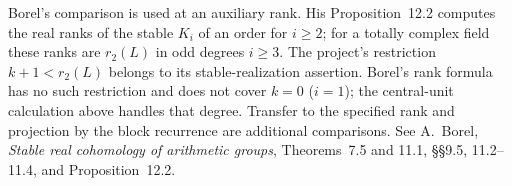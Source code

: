 Borel's comparison is used at an auxiliary rank. His Proposition~12.2
computes the real ranks of the stable \(K_i\) of an order for \(i\ge2\);
for a totally complex field these ranks are \(r_2(L)\) in odd degrees
\(i\ge3\). The project's restriction \(k+1<r_2(L)\) belongs to its
stable-realization assertion. Borel's rank formula has no such
restriction and does not cover \(k=0\) (\(i=1\)); the central-unit
calculation above handles that degree. Transfer to the specified rank
and projection by the block recurrence are additional comparisons.
See A.~Borel, \emph{Stable real cohomology of arithmetic groups},
Theorems~7.5 and 11.1, \S\S9.5, 11.2--11.4, and Proposition~12.2.
\cite{r21-borel}
